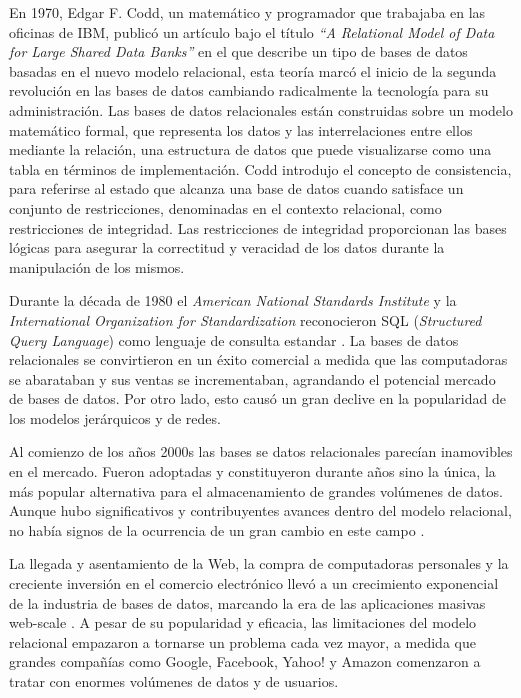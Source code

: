 En 1970, Edgar F. Codd, un matemático y programador que trabajaba en las oficinas de IBM, publicó un
artículo bajo el título \textit{``A Relational Model of Data for Large Shared Data Banks''} \cite{codd1970relational} en el que describe un tipo de bases de datos basadas
en el nuevo modelo relacional, esta teoría marcó el inicio de la segunda revolución en las bases de datos cambiando
radicalmente la tecnología para su administración.
Las bases de datos relacionales están construidas sobre un modelo matemático formal, 
que representa los datos y las interrelaciones entre ellos mediante la relación, 
una estructura de datos que puede visualizarse como una tabla en términos de implementación. 
Codd introdujo el concepto de consistencia, para referirse al estado que alcanza una base de datos cuando satisface un conjunto de restricciones, denominadas en el contexto relacional, 
como restricciones de integridad. Las restricciones de integridad proporcionan las bases lógicas para asegurar la correctitud y veracidad de los datos durante la manipulación de los mismos.

Durante la década de 1980 el \textit{American National Standards Institute} y la \textit{International Organization for Standardization} reconocieron SQL (\textit{Structured Query Language})
como lenguaje de consulta estandar \cite{chamberlin2012early}. 
La bases de datos relacionales se convirtieron en un éxito comercial a medida que las computadoras se abarataban y sus ventas se
incrementaban, agrandando el potencial mercado de bases de datos. Por otro lado, esto causó un gran declive en la popularidad
de los modelos jerárquicos y de redes.

Al comienzo de los años 2000s las bases se datos relacionales parecían inamovibles en el mercado. 
Fueron adoptadas y constituyeron durante años sino la única, la más popular alternativa para el almacenamiento de grandes volúmenes de datos. 
Aunque hubo significativos y contribuyentes avances dentro del modelo relacional, no había signos de la ocurrencia de un gran cambio en este campo \cite{harrison2015next}.

La llegada y asentamiento de la Web, la compra de computadoras personales y la creciente inversión en
el comercio electrónico llevó a un crecimiento exponencial de la industria de bases de datos, marcando
la era de las aplicaciones masivas web-scale \cite{harrison2015next}. A pesar de su popularidad y eficacia,
las limitaciones del modelo relacional empazaron a tornarse un problema cada vez mayor, a medida que grandes
compañías como Google, Facebook, Yahoo! y Amazon comenzaron a tratar con enormes volúmenes de datos y de
usuarios. 


